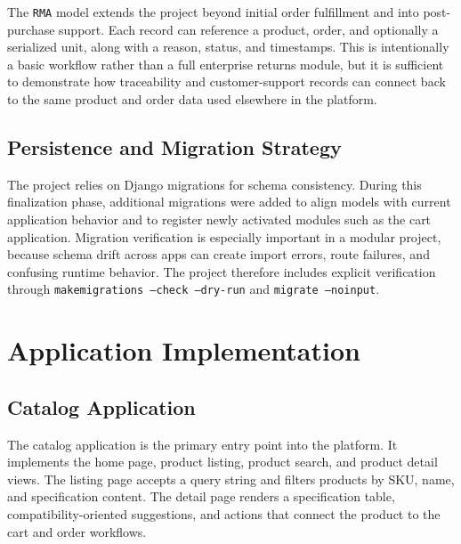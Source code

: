 \documentclass[12pt,letterpaper,oneside,openany]{book}
\begin{document}
\begin{justifying}
The \texttt{RMA} model extends the project beyond initial order fulfillment and
into post-purchase support. Each record can reference a product, order, and
optionally a serialized unit, along with a reason, status, and timestamps. This
is intentionally a basic workflow rather than a full enterprise returns module,
but it is sufficient to demonstrate how traceability and customer-support
records can connect back to the same product and order data used elsewhere in
the platform.
\end{justifying}

\section{Persistence and Migration Strategy}

\begin{justifying}
The project relies on Django migrations for schema consistency. During this
finalization phase, additional migrations were added to align models with current
application behavior and to register newly activated modules such as the cart
application. Migration verification is especially important in a modular
project, because schema drift across apps can create import errors, route
failures, and confusing runtime behavior. The project therefore includes
explicit verification through \texttt{makemigrations --check --dry-run} and
\texttt{migrate --noinput}.
\end{justifying}

\chapter{Application Implementation}

\section{Catalog Application}

\begin{justifying}
The catalog application is the primary entry point into the platform. It
implements the home page, product listing, product search, and product detail
views. The listing page accepts a query string and filters products by SKU,
name, and specification content. The detail page renders a specification table,
compatibility-oriented suggestions, and actions that connect the product to the
cart and order workflows.
\end{justifying}
\end{document}
